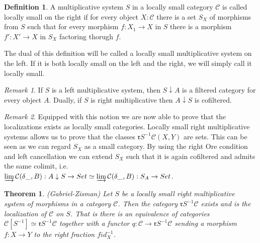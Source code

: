 \documentclass[11pt]{article}
\newtheorem{theorem}{Theorem}[section]
\theoremstyle{definition}
\newtheorem{definition}{Definition}[section]
\theoremstyle{remark}
\newtheorem*{remark}{Remark}
\begin{document}
            \begin{definition}
                A multiplicative system $S$ in a locally small category $\mathcal{C}$ is called locally small on the right if for every object $X:\mathcal{C}$ there is a set $S_X$ of morphisms from $S$ such that for every morphism $f : X_1 \rightarrow X$ in $S$ there is a morphism $f' : X'\rightarrow X$ in $S_X$ factoring thorugh $f$.

                The dual of this definition will be called a locally small multiplicative system on the left. If it is both locally small on the left and the right, we will simply call it locally small. 
            \end{definition}

            \begin{remark}
                If $S$ is a left multiplicative system, then $S\downarrow A$ is a filtered category for every object $A$. Dually, if $S$ is right multiplicative then $A\downarrow S$ is cofiltered.
            \end{remark}

            \begin{remark}
                Equipped with this notion we are now able to prove that the localizations exists as locally small categories. Locally small right multiplicative systems allows us to prove that the classes $\mathfrak{r}S^{-1}\mathcal{C}(X,Y)$ are sets. This can be seen as we can regard $S_X$ as a small category. By using the right Ore condition and left cancellation we can extend $S_X$ such that it is again cofiltered and admits the same colimit, i.e.\\
                 $\varinjlim\mathcal{C}(\delta\_,B):A\downarrow S\rightarrow Set\simeq\varinjlim\mathcal{C}(\delta\_,B):S_A\rightarrow Set$. 
            \end{remark}

            \begin{theorem}
                (Gabriel-Zisman) Let $S$ be a locally small right multiplicative system of morphisms in a category $\mathcal{C}$. Then the category $\mathfrak{r}S^{-1}\mathcal{C}$ exists and is the localization of $\mathcal{C}$ on $S$. That is there is an equivalence of categories $\mathcal{C}[S^{-1}]\simeq\mathfrak{r}S^{-1}\mathcal{C}$ together with a functor $q: \mathcal{C}\rightarrow\mathfrak{r}S^{-1}\mathcal{C}$ sending a morphism $f : X\rightarrow Y$ to the right fraction $fid_X^{-1}$.
            \end{theorem}
\end{document}
